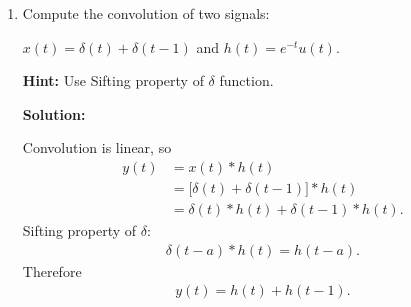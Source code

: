 \documentclass[nohyper,nobib,xcolor=dvipsnames,svgnames,x11names]{tufte-book}
\newenvironment{multiequation}{%
  \setlength{\abovedisplayskip}{3pt}      %
  \setlength{\belowdisplayskip}{6pt}      %
  \setlength{\abovedisplayshortskip}{3pt} %
  \setlength{\belowdisplayshortskip}{6pt} %
  \begin{equation}%
    \begin{aligned}%
}{%
    \end{aligned}%
  \end{equation}%
}
\begin{document}
\begin{enumerate}
\begin{enumerate}
\begin{multiequation}
y(t) = \int_0^2 1 d\tau = 2
\end{multiequation}


\item $3\leq t<5$:

$\max(0,t-3)=t-3$ (since $t-3 < 0$).  $\min(2,t)=2$.


So, integration from $t-3$ to $2$:

\begin{multiequation}
y(t) = \int_{t-3}^2 1 d\tau = 2 - (t-3) = 5 -t
\end{multiequation}

\item $t\geq 5$:

$\max(0,t-3)=t-3$, $\min(2,t)=2$.

But $t-3\geq 2$ (since $t\geq 5$), so lower limit $\geq$ upper limit.

Hence, there is no overlap, and the integration $y(t) = 0$. 

Taking together all, we can write:

\begin{multiequation}
y(t) & = \begin{cases}
0, \quad t < 0\\
t, \quad 0 \leq t < 2\\
2, \quad 2\leq t<3\\
5 -t, \quad 3\leq t<5\\
0, \quad t \geq 5
\end{cases}
\end{multiequation}


\end{enumerate}


\item Compute the convolution of two signals:

$x(t) = \delta(t) + \delta(t-1)$  and  $h(t) = e^{-t} u(t)$.

\textbf{Hint: } Use Sifting property of $\delta$ function.


\textbf{Solution:}


Convolution is linear, so
\begin{multiequation}
y(t) &= x(t)*h(t) \\
     &= \bigl[\delta(t)+\delta(t-1)\bigr]*h(t) \\
     &= \delta(t)*h(t) + \delta(t-1)*h(t).
\end{multiequation}
Sifting property of $\delta$:
\begin{multiequation}
\delta(t-a)*h(t)=h(t-a).
\end{multiequation}
Therefore
\begin{multiequation}
y(t)=h(t)+h(t-1).
\end{multiequation}


\end{enumerate}
\end{document}
